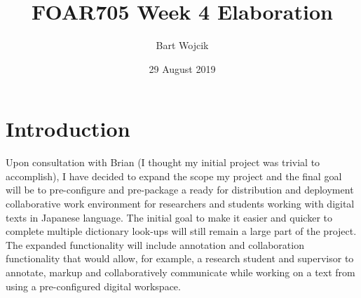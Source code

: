 \documentclass{article}
\title{FOAR705 Week 4 Elaboration}
\author{Bart Wojcik}
\date{29 August 2019}
\begin{document}
\maketitle

\section{Introduction}
Upon consultation with Brian (I thought my initial project was trivial to accomplish), I have decided to expand the scope my project and the final goal will be to pre-configure and pre-package a ready for distribution and deployment collaborative work environment for researchers and students working with digital texts in Japanese language. The initial goal to make it easier and quicker to complete multiple dictionary look-ups will still remain a large part of the project. The expanded functionality will include annotation and collaboration functionality that would allow, for example, a research student and supervisor to annotate, markup and collaboratively communicate while working on a text from using a pre-configured digital workspace.
\end{document}
